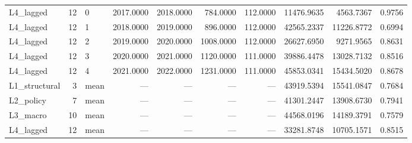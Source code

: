 \begin{table}
\begin{tabular}{lrlrrrrrrr}
L4\_lagged & 12 & 0 & 2017.0000 & 2018.0000 & 784.0000 & 112.0000 & 11476.9635 & 4563.7367 & 0.9756 \\
L4\_lagged & 12 & 1 & 2018.0000 & 2019.0000 & 896.0000 & 112.0000 & 42565.2337 & 11226.8772 & 0.6994 \\
L4\_lagged & 12 & 2 & 2019.0000 & 2020.0000 & 1008.0000 & 112.0000 & 26627.6950 & 9271.9565 & 0.8631 \\
L4\_lagged & 12 & 3 & 2020.0000 & 2021.0000 & 1120.0000 & 111.0000 & 39886.4478 & 13028.7132 & 0.8516 \\
L4\_lagged & 12 & 4 & 2021.0000 & 2022.0000 & 1231.0000 & 111.0000 & 45853.0341 & 15434.5020 & 0.8678 \\
L1\_structural & 3 & mean & — & — & — & — & 43919.5394 & 15541.0847 & 0.7684 \\
L2\_policy & 7 & mean & — & — & — & — & 41301.2447 & 13908.6730 & 0.7941 \\
L3\_macro & 10 & mean & — & — & — & — & 44568.0196 & 14189.3791 & 0.7579 \\
L4\_lagged & 12 & mean & — & — & — & — & 33281.8748 & 10705.1571 & 0.8515 \\
\bottomrule
\end{tabular}
\end{table}
